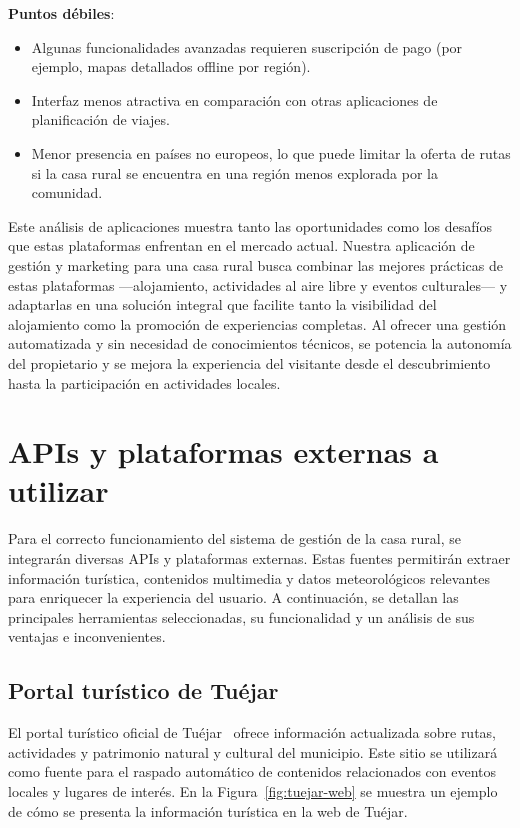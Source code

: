 \textbf{Puntos débiles}:
\begin{itemize}
\item Algunas funcionalidades avanzadas requieren suscripción de pago (por ejemplo, mapas detallados offline por región).
\item Interfaz menos atractiva en comparación con otras aplicaciones de planificación de viajes.
\item Menor presencia en países no europeos, lo que puede limitar la oferta de rutas si la casa rural se encuentra en una región menos explorada por la comunidad.
\end{itemize}

Este análisis de aplicaciones muestra tanto las oportunidades como los desafíos que estas plataformas enfrentan en el mercado actual. Nuestra aplicación de gestión y marketing para una casa rural busca combinar las mejores prácticas de estas plataformas —alojamiento, actividades al aire libre y eventos culturales— y adaptarlas en una solución integral que facilite tanto la visibilidad del alojamiento como la promoción de experiencias completas. Al ofrecer una gestión automatizada y sin necesidad de conocimientos técnicos, se potencia la autonomía del propietario y se mejora la experiencia del visitante desde el descubrimiento hasta la participación en actividades locales.

\section{APIs y plataformas externas a utilizar}

Para el correcto funcionamiento del sistema de gestión de la casa rural, se integrarán diversas \glspl{API} y plataformas externas. Estas fuentes permitirán extraer información turística, contenidos multimedia y datos meteorológicos relevantes para enriquecer la experiencia del usuario. A continuación, se detallan las principales herramientas seleccionadas, su funcionalidad y un análisis de sus ventajas e inconvenientes.

\subsection{Portal turístico de Tuéjar}
El portal turístico oficial de Tuéjar~\cite{url.tuejar} ofrece información actualizada sobre rutas, actividades y patrimonio natural y cultural del municipio. Este sitio se utilizará como fuente para el raspado automático de contenidos relacionados con eventos locales y lugares de interés. En la Figura~\ref{fig:tuejar-web} se muestra un ejemplo de cómo se presenta la información turística en la web de Tuéjar.

